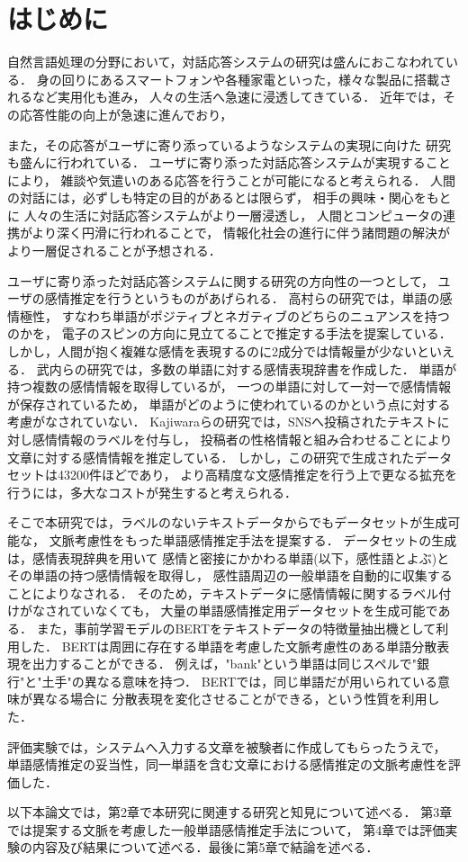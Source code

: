 \chapter{はじめに}
自然言語処理の分野において，対話応答システムの研究は盛んにおこなわれている．
身の回りにあるスマートフォンや各種家電といった，様々な製品に搭載されるなど実用化も進み，
人々の生活へ急速に浸透してきている．
近年では，その応答性能の向上が急速に進んでおり，

また，その応答がユーザに寄り添っているようなシステムの実現に向けた
研究も盛んに行われている．
ユーザに寄り添った対話応答システムが実現することにより，
雑談や気遣いのある応答を行うことが可能になると考えられる．
人間の対話には，必ずしも特定の目的があるとは限らず，
相手の興味・関心をもとに
人々の生活に対話応答システムがより一層浸透し，
人間とコンピュータの連携がより深く円滑に行われることで，
情報化社会の進行に伴う諸問題の解決がより一層促されることが予想される．

ユーザに寄り添った対話応答システムに関する研究の方向性の一つとして，
ユーザの感情推定を行うというものがあげられる．
高村ら\cite{spin_kyokusei}の研究では，単語の感情極性，
すなわち単語がポジティブとネガティブのどちらのニュアンスを持つのかを，
電子のスピンの方向に見立てることで推定する手法を提案している．
しかし，人間が抱く複雑な感情を表現するのに2成分では情報量が少ないといえる．
武内ら\cite{takeuchi}の研究では，多数の単語に対する感情表現辞書を作成した．
単語が持つ複数の感情情報を取得しているが，
一つの単語に対して一対一で感情情報が保存されているため，
単語がどのように使われているのかという点に対する考慮がなされていない．
Kajiwaraら\cite{kajiwara-wrime}の研究では，SNSへ投稿されたテキストに対し感情情報のラベルを付与し，
投稿者の性格情報と組み合わせることにより文章に対する感情情報を推定している．
しかし，この研究で生成されたデータセットは43200件ほどであり，
より高精度な文感情推定を行う上で更なる拡充を行うには，多大なコストが発生すると考えられる．

そこで本研究では，ラベルのないテキストデータからでもデータセットが生成可能な，
文脈考慮性をもった単語感情推定手法を提案する．
データセットの生成は，感情表現辞典\cite{kanjou_hyogen_jiten}を用いて
感情と密接にかかわる単語(以下，感性語とよぶ)とその単語の持つ感情情報を取得し，
感性語周辺の一般単語を自動的に収集することによりなされる．
そのため，テキストデータに感情情報に関するラベル付けがなされていなくても，
大量の単語感情推定用データセットを生成可能である．
また，事前学習モデルのBERT\cite{BERT}をテキストデータの特徴量抽出機として利用した．
BERTは周囲に存在する単語を考慮した文脈考慮性のある単語分散表現を出力することができる．
例えば，"bank"という単語は同じスペルで"銀行"と"土手"の異なる意味を持つ．
BERTでは，同じ単語だが用いられている意味が異なる場合に
分散表現を変化させることができる，という性質を利用した．


評価実験では，システムへ入力する文章を被験者に作成してもらったうえで，
単語感情推定の妥当性，同一単語を含む文章における感情推定の文脈考慮性を評価した．

以下本論文では，第2章で本研究に関連する研究と知見について述べる．
第3章では提案する文脈を考慮した一般単語感情推定手法について，
第4章では評価実験の内容及び結果について述べる．最後に第5章で結論を述べる．
